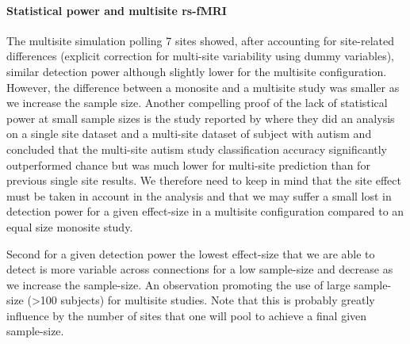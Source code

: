 \documentclass[authoryear]{elsarticle}
\begin{document}
\paragraph{Statistical power and multisite rs-fMRI} The multisite simulation polling 7 sites showed, after accounting for site-related differences (explicit correction for multi-site variability using dummy variables), similar detection power although slightly lower for the multisite configuration. However, the difference between a monosite and a multisite study was smaller as we increase the sample size. Another compelling proof of the lack of statistical power at small sample sizes is the study reported by \cite{Nielsen2013} where they did an analysis on a single site dataset and a multi-site dataset of subject with autism and concluded that the multi-site autism study classification accuracy significantly outperformed chance but was much lower for multi-site prediction than for previous single site results. We therefore need to keep in mind that the site effect must be taken in account in the analysis and that we may suffer a small lost in detection power for a given effect-size in a multisite configuration compared to an equal size monosite study.\\
\par
Second for a given detection power the lowest effect-size that we are able to detect is more variable across connections for a low sample-size and decrease as we increase the sample-size.  
An observation promoting the use of large sample-size (>100 subjects) for multisite studies. Note that this is probably greatly influence by the number of sites that one will pool to achieve a final given sample-size. 


\end{document}
